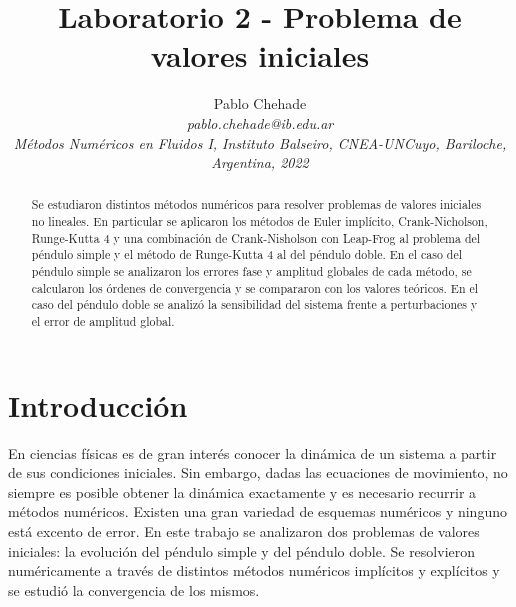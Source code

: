 \documentclass[aps,prb,twocolumn,superscriptaddress,floatfix,longbibliography,10pt]{revtex4-2}
\newif\ifptitle
\newif\ifpnumber
\newcounter{para}
\newcommand\ptitle[1]{\par\refstepcounter{para}
{\ifpnumber{\noindent\textcolor{lightgray}{\textbf{\thepara}}\indent}\fi}
{\ifptitle{\textbf{[{#1}]}}\fi}}
\begin{document}
\newcommand{\mytitle}{Laboratorio 2 - Problema de valores iniciales}

\title{\mytitle}

\author{Pablo Chehade \\
    \small \textit{pablo.chehade@ib.edu.ar} \\
    \small \textit{Métodos Numéricos en Fluidos I, Instituto Balseiro, CNEA-UNCuyo, Bariloche, Argentina, 2022} \\}


\begin{abstract}

Se estudiaron distintos métodos numéricos para resolver problemas de valores iniciales no lineales. En particular se aplicaron los métodos de Euler implícito, Crank-Nicholson, Runge-Kutta 4 y una combinación de Crank-Nisholson con Leap-Frog al problema del péndulo simple y el método de Runge-Kutta 4 al del péndulo doble. En el caso del péndulo simple se analizaron los errores fase y amplitud globales de cada método, se calcularon los órdenes de convergencia y se compararon con los valores teóricos. En el caso del péndulo doble se analizó la sensibilidad del sistema frente a perturbaciones y el error de amplitud global.
\end{abstract}

\maketitle

\section{Introducción}

\ptitle{¿Por qué es importante estudiar numéricamente PVI?}
\ptitle{En este trabajo se analizaron dos problemas de valores iniciales}

En ciencias físicas es de gran interés conocer la dinámica de un sistema a partir de sus condiciones iniciales. Sin embargo, dadas las ecuaciones de movimiento, no siempre es posible obtener la dinámica exactamente y es necesario recurrir a métodos numéricos. Existen una gran variedad de esquemas numéricos y ninguno está excento de error. En este trabajo se analizaron dos problemas de valores iniciales: la evolución del péndulo simple y del péndulo doble. Se resolvieron numéricamente a través de distintos métodos numéricos implícitos y explícitos y se estudió la convergencia de los mismos.
\end{document}
